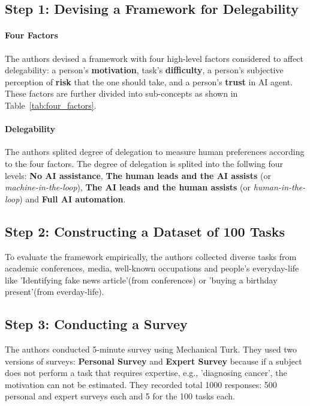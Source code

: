 \documentclass[10pt,twocolumn,letterpaper]{article}
\begin{document}
\subsection{Step 1: Devising a Framework for Delegability}
\paragraph{Four Factors}
The authors devised a framework with four high-level factors considered to affect delegability: a person's \textbf{motivation}, task's \textbf{difficulty}, a person's subjective perception of \textbf{risk} that the one should take, and a person's \textbf{trust} in AI agent. These factors are further divided into sub-concepts as shown in Table~\ref{tab:four_factors}.


\paragraph{Delegability}
The authors splited degree of delegation to measure human preferences according to the four factors. The degree of delegation is splited into the follwing four levels: \textbf{No AI assistance}, \textbf{The human leads and the AI assists} (or \textit{machine-in-the-loop}), \textbf{The AI leads and the human assists} (or \textit{human-in-the-loop}) and \textbf{Full AI automation}.

\subsection{Step 2: Constructing a Dataset of 100 Tasks}
To evaluate the framework empirically, the authors collected diverse tasks from academic conferences, media, well-known occupations and people's everyday-life like 'Identifying fake news article'(from conferences) or 'buying a birthday present'(from everday-life).


\subsection{Step 3: Conducting a Survey}
The authors conducted 5-minute survey using Mechanical Turk. They used two versions of surveys: \textbf{Personal Survey} and \textbf{Expert Survey} because if a subject does not perform a task that requires expertise, e.g., 'diagnosing cancer', the motivation can not be estimated. They recorded total 1000 responses:  500 personal and expert surveys each and 5 for the 100 tasks each.
\vspace{0.2cm}
\end{document}
